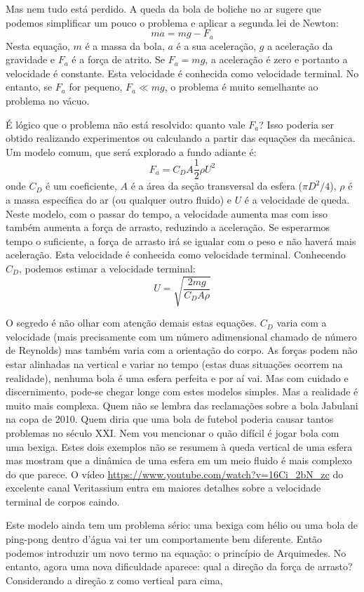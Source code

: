 Mas nem tudo está perdido. A queda da bola de boliche no ar sugere que podemos simplificar um pouco o problema e aplicar a segunda lei de Newton:
\[
m a = m g - F_a
\]
Nesta equação, $m$ é a massa da bola, $a$ é a sua aceleração, $g$ a aceleração da gravidade e $F_a$ é a força de atrito. Se $F_a = m g$, a aceleração é zero e portanto a velocidade é constante. Esta velocidade é conhecida como velocidade terminal. No entanto, se $F_a$ for pequeno, $F_a \ll mg$, o problema é muito semelhante ao problema no vácuo. 

É lógico que o problema não está resolvido: quanto vale $F_a$? Isso poderia ser obtido realizando experimentos ou calculando a partir das equações da mecânica. Um modelo comum, que será explorado a fundo adiante é:
\[
F_a = C_D A \frac{1}{2}\rho U^2
\]
onde $C_D$ é um coeficiente, $A$ é a área da seção transversal da esfera ($\pi D^2 /4$), $\rho$ é a massa específica do ar (ou qualquer outro fluido) e $U$ é a velocidade de queda. Neste modelo, com o passar do tempo, a velocidade aumenta mas com isso também aumenta a força de arrasto, reduzindo a aceleração. Se esperarmos tempo o suficiente, a força de arrasto irá se igualar com o peso e não haverá mais aceleração. Esta velocidade é conhecida como velocidade terminal. Conhecendo $C_D$, podemos estimar a velocidade terminal:
\[
U = \sqrt{\frac{2 m g}{C_D A \rho}}
\]

O segredo é não olhar com atenção demais estas equações. $C_D$ varia com a velocidade (mais precisamente com um número adimensional chamado de número de Reynolds) mas também varia com a orientação do corpo. As forças podem não estar alinhadas na vertical e variar no tempo (estas duas situações ocorrem na realidade), nenhuma bola é uma esfera perfeita  e por aí vai. Mas com cuidado e discernimento, pode-se chegar longe com estes modelos simples. Mas a realidade é muito mais complexa. Quem não se lembra das reclamações sobre a bola Jabulani na copa de 2010. Quem diria que uma bola de futebol poderia causar tantos problemas no século XXI. Nem vou mencionar o quão difícil é jogar bola com uma bexiga. Estes dois exemplos não se resumem à queda vertical de uma esfera mas mostram que a dinâmica de uma esfera em um meio fluido é mais complexo do que parece. O vídeo \url{https://www.youtube.com/watch?v=16Ci_2bN_zc} do excelente canal Veritassium entra em maiores detalhes sobre a velocidade terminal de corpos caindo.

Este modelo ainda tem um problema sério: uma bexiga com hélio ou uma bola de ping-pong dentro d'água vai ter um comportamente bem diferente. Então podemos introduzir um novo termo na equação: o princípio de Arquimedes. No entanto, agora uma nova dificuldade aparece: qual a direção da força de arrasto? Considerando a direção z como vertical para cima,

